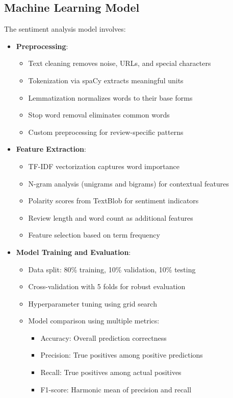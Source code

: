 \documentclass[11pt,a4paper,twocolumn]{article}
\begin{document}
\subsection{Machine Learning Model}
The sentiment analysis model involves:
\begin{itemize}
    \item \textbf{Preprocessing}:
    \begin{itemize}
        \item Text cleaning removes noise, URLs, and special characters
        \item Tokenization via spaCy extracts meaningful units
        \item Lemmatization normalizes words to their base forms
        \item Stop word removal eliminates common words
        \item Custom preprocessing for review-specific patterns
    \end{itemize}
    
    \item \textbf{Feature Extraction}:
    \begin{itemize}
        \item TF-IDF vectorization captures word importance
        \item N-gram analysis (unigrams and bigrams) for contextual features
        \item Polarity scores from TextBlob for sentiment indicators
        \item Review length and word count as additional features
        \item Feature selection based on term frequency
    \end{itemize}
    
    \item \textbf{Model Training and Evaluation}:
    \begin{itemize}
        \item Data split: 80\% training, 10\% validation, 10\% testing
        \item Cross-validation with 5 folds for robust evaluation
        \item Hyperparameter tuning using grid search
        \item Model comparison using multiple metrics:
        \begin{itemize}
            \item Accuracy: Overall prediction correctness
            \item Precision: True positives among positive predictions
            \item Recall: True positives among actual positives
            \item F1-score: Harmonic mean of precision and recall
        \end{itemize}
    \end{itemize}
    

\end{itemize}
\end{document}
